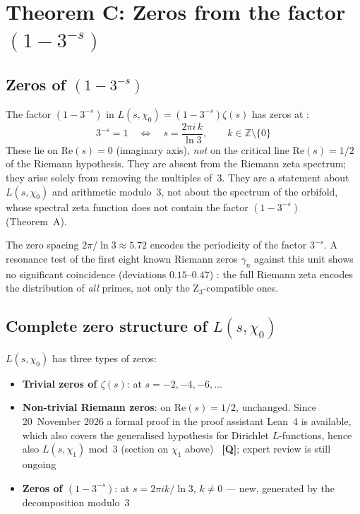 \section{Theorem C: Zeros from the factor $(1-3^{-s})$}

\subsection{Zeros of $(1-3^{-s})$}

The factor $(1-3^{-s})$ in $L(s,\chi_0) = (1-3^{-s})\zeta(s)$
has zeros at \BM:
\begin{equation}
  3^{-s} = 1 \quad\Longleftrightarrow\quad s = \frac{2\pi i\,k}{\ln 3},
  \qquad k \in \mathbb{Z} \setminus \{0\}
\end{equation}
These lie on $\mathrm{Re}(s) = 0$ (imaginary axis), \emph{not} on the
critical line $\mathrm{Re}(s) = 1/2$ of the Riemann hypothesis.
They are absent from the Riemann zeta spectrum; they arise solely from
removing the multiples of~3. They are a statement about $L(s,\chi_0)$ and
arithmetic modulo~3, not about the spectrum of the orbifold, whose spectral zeta
function does not contain the factor $(1-3^{-s})$ (Theorem~A).

The zero spacing $2\pi/\ln 3 \approx 5.72$ encodes the periodicity of the
factor $3^{-s}$. A resonance test of the first eight known Riemann
zeros $\gamma_n$ against this unit shows no significant coincidence
(deviations $0.15$--$0.47$) \BM: the full Riemann zeta encodes the distribution
of \emph{all} primes, not only the Z$_3$-compatible ones.

\subsection{Complete zero structure of $L(s,\chi_0)$}

$L(s,\chi_0)$ has three types of zeros:
\begin{itemize}
  \item \textbf{Trivial zeros of $\zeta(s)$}: at $s = -2,-4,-6,\ldots$
  \item \textbf{Non-trivial Riemann zeros}: on $\mathrm{Re}(s)=1/2$, unchanged.
        Since 20~November 2026 a formal proof in the proof assistant Lean~4 is
        available, which also covers the generalised hypothesis for Dirichlet
        $L$-functions, hence also $L(s,\chi_1)$ mod~3
        (section on $\chi_1$ above)~\cite{Alpoege2026} \textbf{[Q]}; expert review is
        still ongoing
  \item \textbf{Zeros of $(1-3^{-s})$}: at $s = 2\pi ik/\ln 3$, $k\neq 0$
        — new, generated by the decomposition modulo~3 \BM
\end{itemize}

